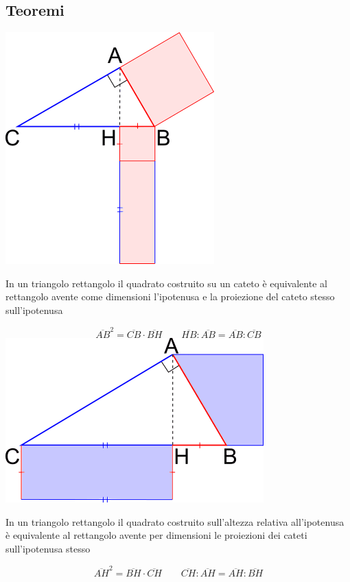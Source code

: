 \documentclass[12pt, a4paper,oneside]{report}
\begin{document}
	\subsection{Teoremi}
	\includegraphics{Eu1.jpg}	
	\begin{euclide1}
	In un triangolo rettangolo il quadrato costruito su un cateto è equivalente al rettangolo avente come dimensioni l'ipotenusa e la proiezione del cateto stesso sull'ipotenusa
	\end{euclide1}
	\[
	\overline{AB}^2=\overline{CB} \cdot \overline{BH}\qquad\overline{HB}:\overline{AB}=\overline{AB}:\overline{CB}
	\]
	\includegraphics{Eu2.jpg}
	\begin{euclide2}
	In un triangolo rettangolo il quadrato costruito sull'altezza relativa all'ipotenusa è equivalente al rettangolo avente per dimensioni le proiezioni dei cateti sull'ipotenusa stesso
	\end{euclide2}
	\[
	\overline{AH}^2=\overline{BH}\cdot\overline{CH}
	\qquad
	\overline{CH}:\overline{AH}=\overline{AH}:\overline{BH}
	\]
	\\
\end{document}
